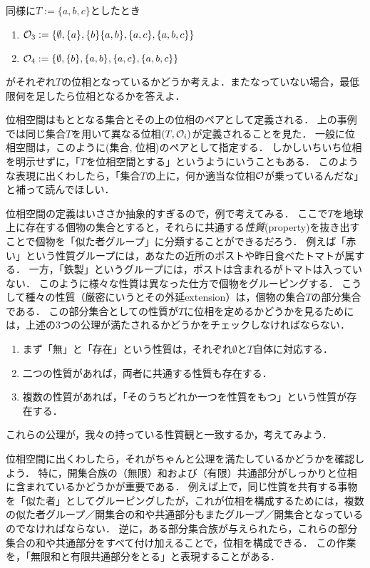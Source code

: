 \documentclass[11pt,a4paper, dvipdfmx]{jsarticle}
\begin{document}
\begin{exercise}
\label{topologyex}
同様に$T:=\{a, b, c\}$としたとき
\begin{enumerate}
\item $\mathcal{O}_3 := \{ \emptyset, \{a \}, \{b\} \{a,b\}, \{a, c\}, \{a,b,c\} \}$
\item $\mathcal{O}_4 := \{ \emptyset, \{b\}, \{a,b\}, \{a, c\}, \{a,b,c\} \}$
\end{enumerate}
がそれぞれ$T$の位相となっているかどうか考えよ．またなっていない場合，最低限何を足したら位相となるかを答えよ．
\end{exercise}

位相空間はもととなる集合とその上の位相のペアとして定義される．
上の事例では同じ集合$T$を用いて異なる位相$(T, \mathcal{O}_i)$が定義されることを見た．
一般に位相空間は，このように(集合, 位相)のペアとして指定する．
しかしいちいち位相を明示せずに，「$T$を位相空間とする」というようにいうこともある．
このような表現に出くわしたら，「集合$T$の上に，何か適当な位相$\mathcal{O}$が乗っているんだな」と補って読んでほしい．


\begin{example}
位相空間の定義はいささか抽象的すぎるので，例で考えてみる．
ここで$T$を地球上に存在する個物の集合とすると，それらに共通する\emph{性質}(property)を抜き出すことで個物を「似た者グループ」に分類することができるだろう．
例えば「赤い」という性質グループには，あなたの近所のポストや昨日食べたトマトが属する．
一方，「鉄製」というグループには，ポストは含まれるがトマトは入っていない．
このように様々な性質は異なった仕方で個物をグルーピングする．
こうして種々の性質（厳密にいうとその外延extension）は，個物の集合$T$の部分集合である．
この部分集合としての性質が$T$に位相を定めるかどうかを見るためには，上述の3つの公理が満たされるかどうかをチェックしなければならない．
\begin{enumerate}
 \item まず「無」と「存在」という性質は，それぞれ$\emptyset$と$T$自体に対応する．
 \item 二つの性質があれば，両者に共通する性質も存在する．
 \item 複数の性質があれば，「そのうちどれか一つを性質をもつ」という性質が存在する．
\end{enumerate}
これらの公理が，我々の持っている性質観と一致するか，考えてみよう．
\end{example}


位相空間に出くわしたら，それがちゃんと公理を満たしているかどうかを確認しよう．
特に，開集合族の（無限）和および（有限）共通部分がしっかりと位相に含まれているかどうかが重要である．
例えば上で，同じ性質を共有する事物を「似た者」としてグルーピングしたが，これが位相を構成するためには，複数の似た者グループ／開集合の和や共通部分もまたグループ／開集合となっているのでなければならない．
逆に，ある部分集合族が与えられたら，これらの部分集合の和や共通部分をすべて付け加えることで，位相を構成できる．
この作業を，「無限和と有限共通部分をとる」と表現することがある．
\end{document}
